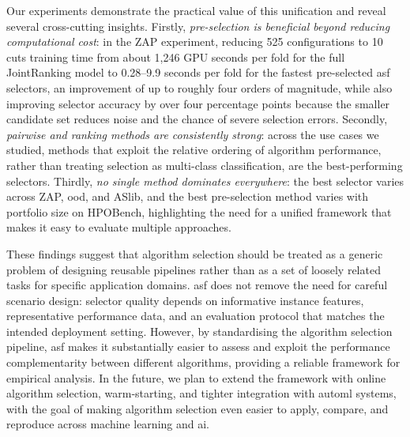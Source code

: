 Our experiments demonstrate the practical value of this unification and reveal several cross-cutting insights.
Firstly, \emph{pre-selection is beneficial beyond reducing computational cost}: in the ZAP experiment, reducing 525 configurations to 10 cuts training time from about 1,246 GPU seconds per fold for the full JointRanking model to 0.28--9.9 seconds per fold for the fastest pre-selected \gls{asf} selectors, an improvement of up to roughly four orders of magnitude, while also improving selector accuracy by over four percentage points because the smaller candidate set reduces noise and the chance of severe selection errors.
Secondly, \emph{pairwise and ranking methods are consistently strong}: across the use cases we studied, methods that exploit the relative ordering of algorithm performance, rather than treating selection as multi-class classification, are the best-performing selectors.
Thirdly, \emph{no single method dominates everywhere}: the best selector varies across ZAP, \gls{ood}, and ASlib, and the best pre-selection method varies with portfolio size on HPOBench, highlighting the need for a unified framework that makes it easy to evaluate multiple approaches.

These findings suggest that algorithm selection should be treated as a generic problem of designing reusable pipelines rather than as a set of loosely related tasks for specific application domains.
\Gls{asf} does not remove the need for careful scenario design: selector quality depends on informative instance features, representative performance data, and an evaluation protocol that matches the intended deployment setting. However, by standardising the algorithm selection pipeline, \gls{asf} makes it substantially easier to assess and exploit the performance complementarity between different algorithms, providing a reliable framework for empirical analysis.
In the future, we plan to extend the framework with online algorithm selection, warm-starting, and tighter integration with \gls{automl} systems, with the goal of making algorithm selection even easier to apply, compare, and reproduce across machine learning and \gls{ai}.


